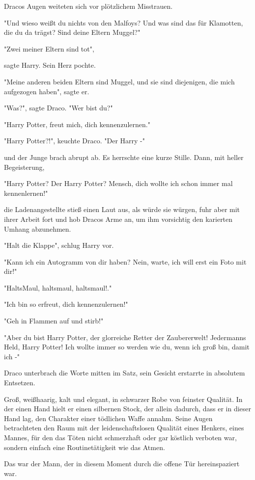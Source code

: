 {Dracos Augen weiteten sich vor plötzlichem Misstrauen.

"Und wieso weißt du nichts von den Malfoys? Und was sind das für Klamotten, die du da trägst? Sind deine Eltern Muggel?"

"Zwei meiner Eltern sind tot",

sagte Harry. Sein Herz pochte.

"Meine anderen beiden Eltern sind Muggel, und sie sind diejenigen, die mich aufgezogen haben", sagte er.

"Was?", sagte Draco. "Wer bist du?"

"Harry Potter, freut mich, dich kennenzulernen."

"Harry Potter?!", keuchte Draco. "Der Harry -"

und der Junge brach abrupt ab. Es herrschte eine kurze Stille. Dann, mit heller Begeisterung,

"Harry Potter? Der Harry Potter? Mensch, dich wollte ich schon immer mal kennenlernen!"

die Ladenangestellte stieß einen Laut aus, als würde sie würgen, fuhr aber mit ihrer Arbeit fort und hob Dracos Arme an, um ihm vorsichtig den karierten Umhang abzunehmen.

"Halt die Klappe", schlug Harry vor.

"Kann ich ein Autogramm von dir haben? Nein, warte, ich will erst ein Foto mit dir!"

"HaltsMaul, haltsmaul, haltsmaul!."

"Ich bin so erfreut, dich kennenzulernen!"

"Geh in Flammen auf und stirb!"

"Aber du bist Harry Potter, der glorreiche Retter der Zaubererwelt! Jedermanns Held, Harry Potter! Ich wollte immer so werden wie du, wenn ich groß bin, damit ich -"

Draco unterbrach die Worte mitten im Satz, sein Gesicht erstarrte in absolutem Entsetzen.

Groß, weißhaarig, kalt und elegant, in schwarzer Robe von feinster Qualität. In der einen Hand hielt er einen silbernen Stock, der allein dadurch, dass er in dieser Hand lag, den Charakter einer tödlichen Waffe annahm. Seine Augen betrachteten den Raum mit der leidenschaftslosen Qualität eines Henkers, eines Mannes, für den das Töten nicht schmerzhaft oder gar köstlich verboten war, sondern einfach eine Routinetätigkeit wie das Atmen.

Das war der Mann, der in diesem Moment durch die offene Tür hereinspaziert war.

}

